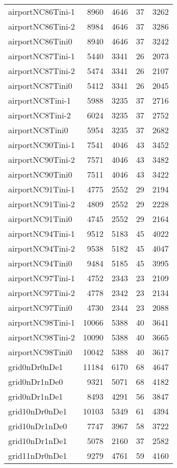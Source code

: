 \begin{longtable}{lrrrr}
airportNC86Tini-1 & 8960 & 4646 & 37 & 3262 \\
airportNC86Tini-2 & 8984 & 4646 & 37 & 3286 \\
airportNC86Tini0 & 8940 & 4646 & 37 & 3242 \\
airportNC87Tini-1 & 5440 & 3341 & 26 & 2073 \\
airportNC87Tini-2 & 5474 & 3341 & 26 & 2107 \\
airportNC87Tini0 & 5412 & 3341 & 26 & 2045 \\
airportNC8Tini-1 & 5988 & 3235 & 37 & 2716 \\
airportNC8Tini-2 & 6024 & 3235 & 37 & 2752 \\
airportNC8Tini0 & 5954 & 3235 & 37 & 2682 \\
airportNC90Tini-1 & 7541 & 4046 & 43 & 3452 \\
airportNC90Tini-2 & 7571 & 4046 & 43 & 3482 \\
airportNC90Tini0 & 7511 & 4046 & 43 & 3422 \\
airportNC91Tini-1 & 4775 & 2552 & 29 & 2194 \\
airportNC91Tini-2 & 4809 & 2552 & 29 & 2228 \\
airportNC91Tini0 & 4745 & 2552 & 29 & 2164 \\
airportNC94Tini-1 & 9512 & 5183 & 45 & 4022 \\
airportNC94Tini-2 & 9538 & 5182 & 45 & 4047 \\
airportNC94Tini0 & 9484 & 5185 & 45 & 3995 \\
airportNC97Tini-1 & 4752 & 2343 & 23 & 2109 \\
airportNC97Tini-2 & 4778 & 2342 & 23 & 2134 \\
airportNC97Tini0 & 4730 & 2344 & 23 & 2088 \\
airportNC98Tini-1 & 10066 & 5388 & 40 & 3641 \\
airportNC98Tini-2 & 10090 & 5388 & 40 & 3665 \\
airportNC98Tini0 & 10042 & 5388 & 40 & 3617 \\
grid0nDr0nDe1 & 11184 & 6170 & 68 & 4647 \\
grid0nDr1nDe0 & 9321 & 5071 & 68 & 4182 \\
grid0nDr1nDe1 & 8493 & 4291 & 56 & 3847 \\
grid10nDr0nDe1 & 10103 & 5349 & 61 & 4394 \\
grid10nDr1nDe0 & 7747 & 3967 & 58 & 3722 \\
grid10nDr1nDe1 & 5078 & 2160 & 37 & 2582 \\
grid11nDr0nDe1 & 9279 & 4761 & 59 & 4160 \\

\end{longtable}

